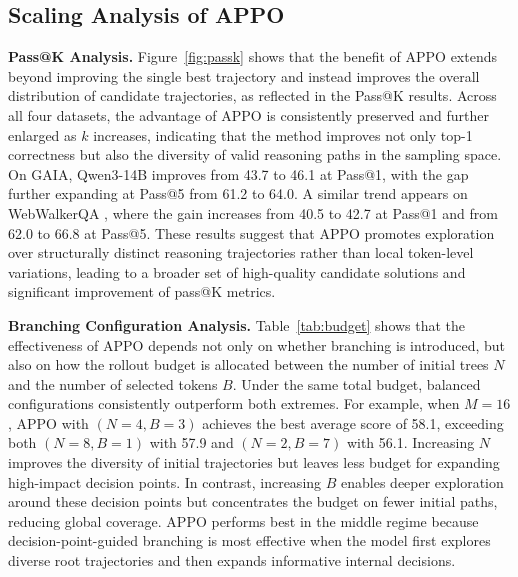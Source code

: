 \documentclass{llmxive}
\begin{document}
\vspace{-0.3cm}
\subsection{Scaling Analysis of APPO}

\noindent\textbf{Pass@K Analysis.} 
Figure~\ref{fig:passk} shows that the benefit of APPO extends beyond improving the single best trajectory and instead improves the overall distribution of candidate trajectories, as reflected in the Pass@K results. Across all four datasets, the advantage of APPO is consistently preserved and further enlarged as $k$ increases, indicating that the method improves not only top-1 correctness but also the diversity of valid reasoning paths in the sampling space. On GAIA, Qwen3-14B improves from 43.7 to 46.1 at Pass@1, with the gap further expanding at Pass@5 from 61.2 to 64.0. A similar trend appears on WebWalkerQA , where the gain increases from 40.5 to 42.7 at Pass@1 and from 62.0 to 66.8 at Pass@5. These results suggest that APPO promotes exploration over structurally distinct reasoning trajectories rather than local token-level variations, leading to a broader set of high-quality candidate solutions and significant improvement of pass@K metrics.

\noindent\textbf{Branching Configuration Analysis.} 
Table~\ref{tab:budget} shows that the effectiveness of APPO depends not only on whether branching is introduced, but also on how the rollout budget is allocated between the number of initial trees $N$ and the number of selected tokens $B$. 
Under the same total budget, balanced configurations consistently outperform both extremes. 
For example, when $M=16$, APPO with $(N=4, B=3)$ achieves the best average score of 58.1, exceeding both $(N=8, B=1)$ with 57.9 and $(N=2, B=7)$ with 56.1. 
Increasing $N$ improves the diversity of initial trajectories but leaves less budget for expanding high-impact decision points. 
In contrast, increasing $B$ enables deeper exploration around these decision points but concentrates the budget on fewer initial paths, reducing global coverage. 
APPO performs best in the middle regime because decision-point-guided branching is most effective when the model first explores diverse root trajectories and then expands informative internal decisions.
\end{document}
